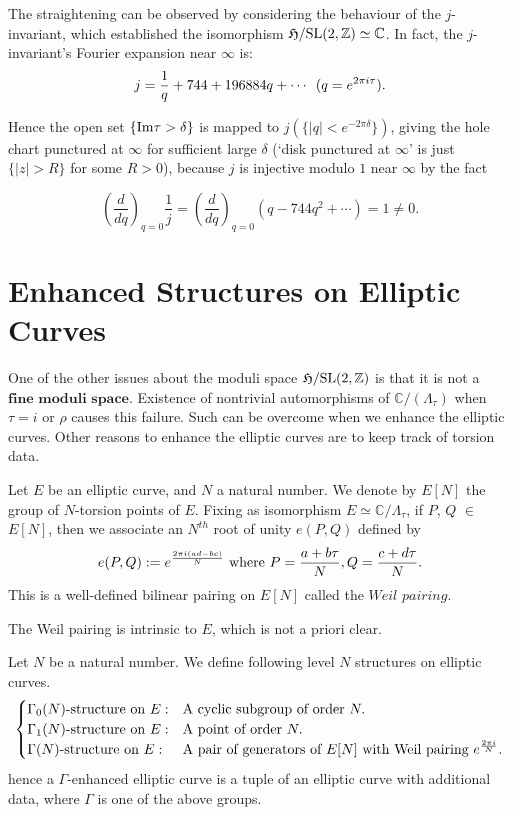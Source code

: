 \documentclass[a4paper,11pt]{article}
\begin{document}
The straightening can be observed by considering the behaviour of the $j$-invariant, which established the isomorphism $\mathfrak{H}/\textnormal{SL}(2,\mathbb{Z})\simeq\mathbb{C}$.
In fact, the $j$-invariant's Fourier expansion near $\infty$ is:
\[
j=\frac{1}{q}+744+196884q+\cdots \enskip (q=e^{2\pi i\tau}).
\]

Hence the open set $\{\textnormal{Im}\tau>\delta\}$ is mapped to $j(\{|q|<e^{-2\pi\delta}\})$, giving the hole chart punctured at $\infty$ for sufficient large $\delta$
(`disk punctured at $\infty$' is just $\{|z|>R\}$ for some $R>0$), because $j$ is injective modulo $1$ near $\infty$ by the fact

\[
\left(\frac{d}{dq}\right)_{q=0}\frac{1}{j}=\left(\frac{d}{dq}\right)_{q=0}(q-744q^2+\cdots)=1\neq0.
\]



\section{Enhanced Structures on Elliptic Curves}

One of the other issues about the moduli space $\mathfrak{H}/\textnormal{SL}(2,\mathbb{Z})$ is that it is not a $\textbf{fine moduli space}$.
Existence of nontrivial automorphisms of $\mathbb{C}/(\Lambda_{\tau})$ when $\tau=i$ or $\rho$ causes this failure.
Such can be overcome when we enhance the elliptic curves.
Other reasons to enhance the elliptic curves are to keep track of torsion data.


\begin{defn}
Let $E$ be an elliptic curve, and $N$ a natural number.
We denote by $E[N]$ the group of $N$-torsion points of $E$.
Fixing as isomorphism $E\simeq\mathbb{C}/\Lambda_{\tau}$, if $P$, $Q$ $\in$ $E[N]$, then we associate an $N^{th}$ root of unity $e(P,Q)$ defined by
\[
e(P,Q):=e^{\frac{2\pi i(ad-bc)}{N}} \textnormal{ where } P=\frac{a+b\tau}{N}, Q=\frac{c+d\tau}{N}.
\]
This is a well-defined bilinear pairing on $E[N]$ called the $\textit{Weil pairing}$.
\end{defn}

The Weil pairing is intrinsic to $E$, which is not a priori clear.

\begin{defn}
Let $N$ be a natural number.
We define following level $N$ structures on elliptic curves.
\[
\begin{cases}
\Gamma_0(N)\textnormal{-structure on }E: & \textnormal{A cyclic subgroup of order }N.\\
\Gamma_1(N)\textnormal{-structure on }E: & \textnormal{A point of order }N.\\
\Gamma(N)\textnormal{-structure on }E: & \textnormal{A pair of generators of }E[N] \textnormal{ with Weil pairing } e^{\frac{2\pi i}{N}}.
\end{cases}
\]
hence a $\Gamma$-enhanced elliptic curve is a tuple of an elliptic curve with additional data, where $\Gamma$ is one of the above groups.
\end{defn}
\end{document}
